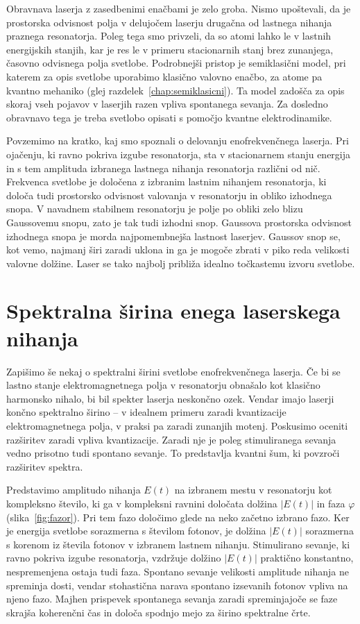 \begin{remark}
Obravnava laserja z zasedbenimi enačbami je zelo groba. Nismo
upoštevali, da je prostorska odvisnost polja v delujočem laserju 
drugačna od lastnega nihanja praznega resonatorja. Poleg tega smo
privzeli, da so atomi lahko le v lastnih energijskih stanjih, kar je res le
v primeru stacionarnih stanj brez zunanjega, časovno odvisnega polja
svetlobe. Podrobnejši pristop je semiklasični model, pri katerem 
za opis svetlobe uporabimo klasično valovno enačbo, za atome
pa kvantno mehaniko (glej razdelek~\ref{chap:semiklasicni}). Ta model
zadošča za opis skoraj vseh pojavov v laserjih razen vpliva spontanega sevanja. 
Za dosledno obravnavo tega je treba svetlobo opisati s pomočjo 
kvantne elektrodinamike.
\end{remark}

Povzemimo na kratko, kaj smo spoznali o delovanju 
enofrekvenčnega laserja. Pri ojačenju, ki ravno pokriva izgube 
resonatorja, sta v stacionarnem stanju energija in s tem amplituda 
izbranega lastnega nihanja resonatorja različni od nič. Frekvenca svetlobe je
določena z izbranim lastnim nihanjem resonatorja, ki določa tudi prostorsko
odvisnost valovanja v resonatorju in obliko izhodnega snopa. V navadnem stabilnem 
resonatorju je polje po obliki zelo blizu Gaussovemu snopu, zato je tak tudi izhodni snop.
Gaussova prostorska odvisnost izhodnega snopa je morda najpomembnejša lastnost
laserjev. Gaussov snop se, kot vemo, najmanj širi zaradi uklona in ga je mogoče
zbrati v piko reda velikosti valovne dolžine. Laser se tako najbolj 
približa idealno točkastemu izvoru svetlobe.

\section{Spektralna širina enega laserskega nihanja}
Zapišimo še nekaj o spektralni širini svetlobe enofrekvenčnega laserja. 
Če bi se lastno stanje 
elektromagnetnega polja v resonatorju obnašalo kot klasično 
harmonsko nihalo, bi bil spekter laserja neskončno ozek. Vendar 
imajo laserji končno spektralno širino -- v idealnem primeru zaradi
kvantizacije elektromagnetnega polja, v praksi pa zaradi zunanjih motenj.
Poskusimo oceniti razširitev zaradi vpliva kvantizacije. Zaradi nje
je poleg stimuliranega sevanja vedno prisotno tudi spontano sevanje. To 
predstavlja kvantni šum, ki povzroči razširitev spektra. 

Predstavimo amplitudo nihanja $E(t)$ na izbranem mestu v resonatorju kot kompleksno 
število, ki ga v kompleksni ravnini določata dolžina $|E(t)|$ in faza
$\varphi$ (slika~\ref{fig:fazor}). 
Pri tem fazo določimo glede na neko začetno izbrano fazo. 
Ker je energija svetlobe sorazmerna s številom fotonov, je dolžina $|E(t)|$
sorazmerna s korenom iz števila fotonov v izbranem lastnem nihanju. 
Stimulirano sevanje, ki ravno pokriva izgube resonatorja, vzdržuje
dolžino $|E(t)|$ praktično konstantno, nespremenjena ostaja 
tudi faza. Spontano sevanje velikosti amplitude nihanja ne spreminja dosti, 
vendar stohastična narava spontano izsevanih fotonov vpliva na njeno fazo.
Majhen prispevek spontanega sevanja zaradi spreminjajoče se faze
skrajša koherenčni čas in določa spodnjo mejo za širino spektralne črte. 

